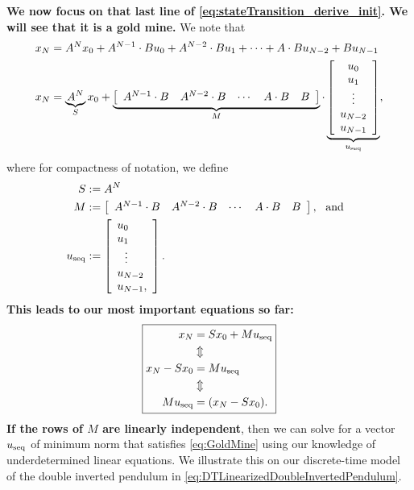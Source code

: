 \textbf{We now focus on that last line of \eqref{eq:stateTransition_derive_init}. We will see that it is a gold mine.} We note that
\begin{align}
       x_N &=  A^N x_0 + A^{N-1} \cdot B u_0 + A^{N-2} \cdot B u_1 + \cdots + A \cdot B u_{N-2} + B u_{N-1}\\
       x_N&=  \underbrace{A^N}_{S}x_0+ \underbrace{\left[\begin{array}{ccccc} A^{N-1} \cdot B  & A^{N-2} \cdot B & \cdots & A\cdot B & B \end{array} \right]}_{M} \cdot  \underbrace{\left[\begin{array}{c} u_0 \\ u_1 \\  \vdots \\ u_{N-2} \\ u_{N-1} \end{array} \right]}_{u_{\rm seq}},
       \label{eq:stateTransition_derive}
\end{align}
where for compactness of notation, we define
\begin{align}
\label{eq:CompactFormula01}
S&:= A^N \\
\label{eq:CompactFormula02}
M &:=\left[\begin{array}{ccccc} A^{N-1} \cdot B  & A^{N-2} \cdot B & \cdots & A\cdot B & B \end{array} \right], \text{~~and~~}  \\
\label{eq:CompactFormula3}
u_{\rm seq}&:=\left[\begin{array}{l} u_0 \\ u_1 \\  ~~\vdots \\ u_{N-2} \\ u_{N-1}, \end{array} \right].
\end{align}
\textbf{This leads to our most important equations so far:}
\begin{equation}
    \label{eq:GoldMine}
\boxed{\begin{aligned}
   x_N &= S x_0 + M u_{\rm seq} \\
   & \Updownarrow \\
    x_N - S x_0 &= M u_{\rm seq}  \\
      & \Updownarrow \\
    M u_{\rm seq} &= (x_N - S x_0).
\end{aligned}}
\end{equation}
\textbf{If the rows of $M$ are linearly independent}, then we can solve for a vector $u_{\rm seq}$ of minimum norm that satisfies \eqref{eq:GoldMine} using our knowledge of underdetermined linear equations. We illustrate this on our discrete-time model of the double inverted pendulum in \eqref{eq:DTLinearizedDoubleInvertedPendulum}.




